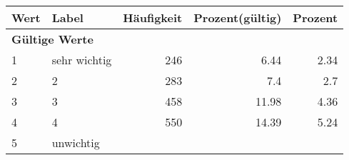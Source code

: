      \begin{longtable}{lXrrr}
     \toprule
     \textbf{Wert} & \textbf{Label} & \textbf{Häufigkeit} & \textbf{Prozent(gültig)} & \textbf{Prozent} \\
     \endhead
     \midrule
     \multicolumn{5}{l}{\textbf{Gültige Werte}}\\

     1 &
     \multicolumn{1}{X}{ sehr wichtig   } &


       \num{246} &
       \num[round-mode=places,round-precision=2]{6,44} &
         \num[round-mode=places,round-precision=2]{2,34} \\

     2 &
     \multicolumn{1}{X}{ 2   } &


       \num{283} &
       \num[round-mode=places,round-precision=2]{7,4} &
         \num[round-mode=places,round-precision=2]{2,7} \\

     3 &
     \multicolumn{1}{X}{ 3   } &


       \num{458} &
       \num[round-mode=places,round-precision=2]{11,98} &
         \num[round-mode=places,round-precision=2]{4,36} \\

     4 &
     \multicolumn{1}{X}{ 4   } &


       \num{550} &
       \num[round-mode=places,round-precision=2]{14,39} &
         \num[round-mode=places,round-precision=2]{5,24} \\

     5 &
     \multicolumn{1}{X}{ unwichtig   } &



\end{longtable}
